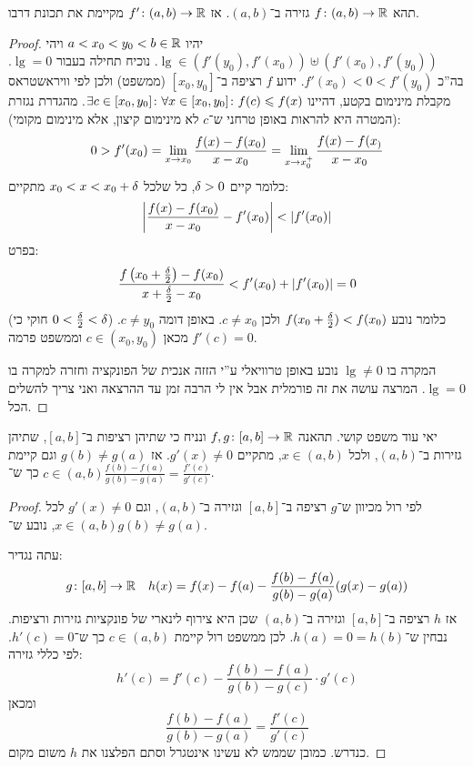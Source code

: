 \documentclass[name=רשימות חשבון דיפרנציאלי ואינטגרלי 1א]{../../../tex/classes/megasumPreamble}
\begin{document}
	\begin{Theorem}
		תהא $f \colon (a, b) \to \mathbb{R}$ גזירה ב־$(a, b)$. אז $f' \colon (a, b) \to \mathbb{R}$ מקיימת את תכונת דרבו.
	\end{Theorem}\begin{proof}
		יהיו $a < x_0 < y_0 < b \in \mathbb{R}$ ויהי $\lg \in (f'(y_0), f'(x_0)) \uplus (f'(x_0), f'(y_0))$. נוכיח תחילה בעבור $\lg = 0$. בה''כ $f'(x_0) < 0 < f'(y_0)$. ידוע $f$ רציפה ב־$[x_0, y_0]$ (ממשפט) ולכן לפי וויראשטראס מקבלת מינימום בקטע, דהיינו $\exists c \in [x_0, y_0] \colon \forall x \in [x_0, y_0] \colon f(c) \leqslant f(x)$. מהגדרת נגזרת (המטרה היא להראות באופן טרחני ש־$c$ לא מינימום קיצון, אלא מינימום מקומי):
		\[ 0 > f'(x_0) = \lim_{x \to x_0} \frac{f(x) - f(x_0)}{x - x_0} = \lim_{x \to x_0^{+}} \frac{f(x) - f(x_)}{x - x_0} \]
		כלומר קיים $\delta > 0$, כל שלכל $x_0 < x < x_0 + \delta$ מתקיים:
		\[ \left \lvert \frac{f(x) - f(x_0)}{x - x_0} - f'(x_0) \right \rvert < \left \lvert f'(x_0) \right \rvert \]
		בפרט:
		\[ \frac{f\left ( x_0 + \frac{\delta}{2} \right ) - f(x_0)}{x + \frac{\delta}{2} - x_0} < f'(x_0) + \left \lvert f'(x_0) \right \rvert = 0 \]
		(חוקי כי $0 < \frac{\delta}{2} < \delta$) כלומר נובע $f(x_0 + \frac{\delta}{2}) < f(x_0)$ ולכן $c \neq x_0$. באופן דומה $c \neq y_0$. מכאן $c \in (x_0, y_0)$ וממשפט פרמה $f'(c) = 0$.

		המקרה בו $\lg \neq 0$ נובע באופן טרוויאלי ע''י הזזה אנכית של הפונקציה וחזרה למקרה בו $\lg = 0$. המרצה עושה את זה פורמלית אבל אין לי הרבה זמן עד ההרצאה ואני צריך להשלים הכל.
	\end{proof}

	\begin{Theorem}
		יאי עוד משפט קושי. תהאנה $f, g \colon [a, b] \to \mathbb{R}$ ונניח כי שתיהן רציפות ב־$[a, b]$, שתיהן גזירות ב־$(a, b)$, ולכל $x \in (a, b)$, מתקיים $g'(x) \neq 0$. אז $g(b) \neq g(a)$ וגם קיימת $c \in (a, b)$ כך ש־$\frac{f(b) - f(a)}{g(b) - g(a)} = \frac{f'(c)}{g'(c)}$. \begin{proof}
			לפי רול מכיוון ש־$g$ רציפה ב־$[a, b]$ וגזירה ב־$(a, b)$, וגם $g'(x) \neq 0$ לכל $x \in (a, b)$, נובע ש־$g(b) \neq g(a)$.

			עתה נגדיר:
			\[ g \colon [a, b] \to \mathbb{R}\quad h(x) = f(x)- f(a) - \frac{f(b) - f(a)}{g(b) - g(a)}(g(x)- g(a)) \]
			אז $h$ רציפה ב־$[a, b]$ וגזירה ב־$(a, b)$ שכן היא צירוף לינארי של פונקציות גזירות ורציפות. נבחין ש־$h(a) = 0 = h(b)$. לכן ממשפט רול קיימת $c \in (a, b)$ כך ש־$h'(c) = 0$. לפי כללי גזירה:
			\[ h'(c) = f'(c) - \frac{f(b) - f(a)}{g(b) - g(c)} \cdot g'(c) \]
			ומכאן
			\[ \frac{f(b) - f(a)}{g(b) - g(a)} = \frac{f'(c)}{g'(c)} \]
			כנדרש. כמובן שממש לא עשינו אינטגרל וסתם הפלצנו את $h$ משום מקום.
		\end{proof}
	\end{Theorem}
\end{document}
